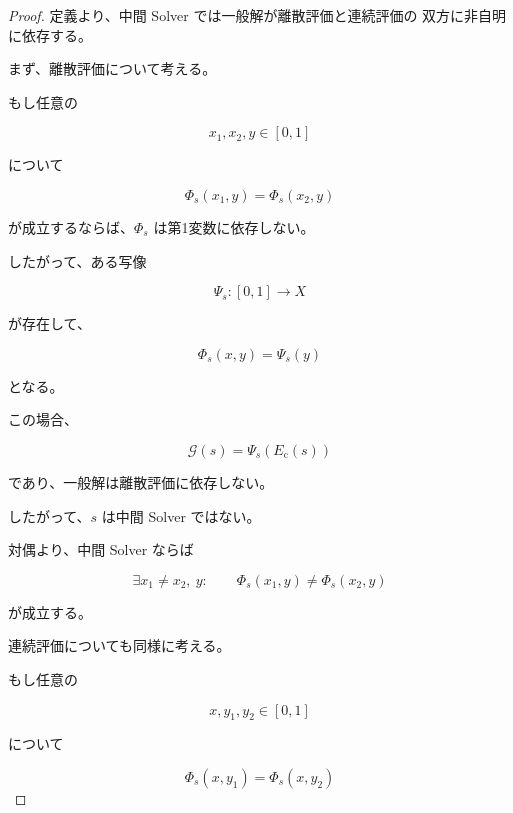 \documentclass[a4paper,11pt]{article}
\begin{document}
\begin{proof}

定義より、中間 Solver では一般解が離散評価と連続評価の
双方に非自明に依存する。

まず、離散評価について考える。

もし任意の

\begin{equation}
    x_1,x_2,y\in[0,1]
\end{equation}

について

\begin{equation}
    \Phi_s(x_1,y)
    =
    \Phi_s(x_2,y)
\end{equation}

が成立するならば、$\Phi_s$ は第1変数に依存しない。

したがって、ある写像

\begin{equation}
    \Psi_s:
    [0,1]
    \longrightarrow
    X
\end{equation}

が存在して、

\begin{equation}
    \Phi_s(x,y)
    =
    \Psi_s(y)
\end{equation}

となる。

この場合、

\begin{equation}
    \mathcal{G}(s)
    =
    \Psi_s(E_{\mathrm c}(s))
\end{equation}

であり、一般解は離散評価に依存しない。

したがって、$s$ は中間 Solver ではない。

対偶より、中間 Solver ならば

\begin{equation}
    \exists x_1\neq x_2,\ y:
    \qquad
    \Phi_s(x_1,y)
    \neq
    \Phi_s(x_2,y)
\end{equation}

が成立する。

連続評価についても同様に考える。

もし任意の

\begin{equation}
    x,y_1,y_2\in[0,1]
\end{equation}

について

\begin{equation}
    \Phi_s(x,y_1)
    =
    \Phi_s(x,y_2)
\end{equation}


\end{proof}
\end{document}
